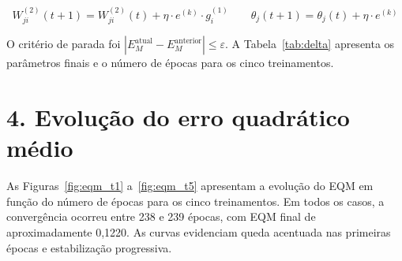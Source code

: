 \documentclass[article, 12pt, oneside, a4paper, section = TITLE, brazil]{abntex2}
\begin{document}
\begin{equation*}
    W_{ji}^{(2)}(t+1) = W_{ji}^{(2)}(t) + \eta \cdot e^{(k)} \cdot g_i^{(1)}
    \qquad
    \theta_j(t+1) = \theta_j(t) + \eta \cdot e^{(k)}
\end{equation*}

O critério de parada foi $\left|E_M^{\text{atual}} - E_M^{\text{anterior}}\right| \leq \varepsilon$. A Tabela~\ref{tab:delta} apresenta os parâmetros finais e o número de épocas para os cinco treinamentos.

\begin{table}[H]
    \centering
    \caption{Parâmetros finais da camada de saída nos cinco treinamentos (Tabela 2 do roteiro).}
    \label{tab:delta}
    \renewcommand{\arraystretch}{1.3}
\end{table}

\section*{4. Evolução do erro quadrático médio}

As Figuras~\ref{fig:eqm_t1} a~\ref{fig:eqm_t5} apresentam a evolução do EQM em função do número de épocas para os cinco treinamentos. Em todos os casos, a convergência ocorreu entre 238 e 239 épocas, com EQM final de aproximadamente 0,1220. As curvas evidenciam queda acentuada nas primeiras épocas e estabilização progressiva.
\end{document}

